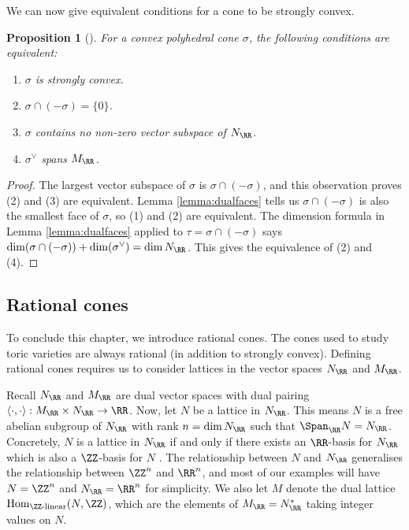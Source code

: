 \documentclass[12pt]{amsart}
\theoremstyle{plain}
\newtheorem{proposition}[theorem]{Proposition}
\begin{document}
We can now give equivalent conditions for a cone to be strongly convex.

\begin{proposition}[{\cite[\S 1.2, Proposition 3]{Fulton93}}]\label{stronglyconvexprop}
For a convex polyhedral cone $\sigma$, the following conditions are equivalent:
\begin{enumerate}
\item $\sigma$ is strongly convex.
\item $\sigma \cap (-\sigma) = \{0\}$.
\item $\sigma$ contains no non-zero vector subspace of $N_\RR$.
\item $\sigma^\vee$ spans $M_\RR$.
\end{enumerate}
\end{proposition}
\begin{proof}
The largest vector subspace of $\sigma$ is $\sigma \cap (-\sigma)$, and this observation proves (2) and (3) are equivalent.
Lemma \ref{lemma:dualfaces} tells us $\sigma \cap(-\sigma)$ is also the smallest face of $\sigma$, so (1) and (2) are equivalent.
The dimension formula in Lemma \ref{lemma:dualfaces} applied to $\tau = \sigma \cap (-\sigma)$ says $\dim(\sigma \cap (-\sigma)) + \dim(\sigma^\vee) = \dim N_\RR$.
This gives the equivalence of (2) and (4).
\end{proof}





\subsection{Rational cones}\label{section:rationalcones}
To conclude this chapter, we introduce rational cones.
The cones used to study toric varieties are always rational (in addition to strongly convex).
Defining rational cones requires us to consider lattices in the vector spaces $N_\RR$ and $M_\RR$.

Recall $N_\RR$ and $M_\RR$ are dual vector spaces with dual pairing $\langle \cdot , \cdot \rangle : M_\RR \times N_\RR \to \RR$.
Now, let $N$ be a lattice in $N_\RR$.
This means $N$ is a free abelian subgroup of $N_\RR$ with rank $n = \dim N_\RR$ such that $\Span_\RR N = N_\RR$.
Concretely, $N$ is a lattice in $N_\RR$ if and only if there exists an $\RR$-basis for $N_\RR$ which is also a $\ZZ$-basis for $N$ \cite[\S 2.2]{Serre73}.
The relationship between $N$ and $N_\RR$ generalises the relationship between $\ZZ^n$ and $\RR^n$, and most of our examples will have $N = \ZZ^n$ and $N_\RR = \RR^n$ for simplicity.
We also let $M$ denote the dual lattice $\mathrm{Hom}_{\ZZ\text{-linear}}(N, \ZZ)$, which are the elements of $M_\RR = N_\RR^*$ taking integer values on $N$.
\end{document}
